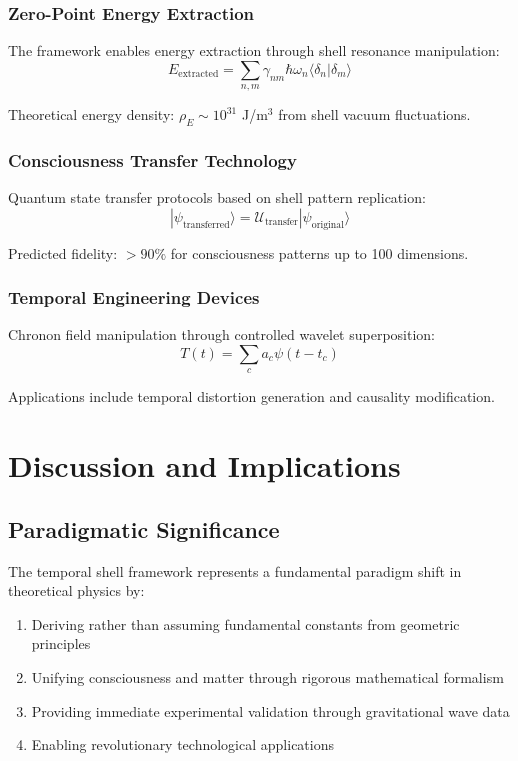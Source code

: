 \documentclass[12pt,a4paper]{article}
\begin{document}
\subsubsection{Zero-Point Energy Extraction}

The framework enables energy extraction through shell resonance manipulation:
\begin{equation}
E_{\text{extracted}} = \sum_{n,m} \gamma_{nm} \hbar\omega_n \langle\delta_n|\delta_m\rangle
\end{equation}

Theoretical energy density: $\rho_E \sim 10^{31}$ J/m$^3$ from shell vacuum fluctuations.

\subsubsection{Consciousness Transfer Technology}

Quantum state transfer protocols based on shell pattern replication:
\begin{equation}
|\psi_{\text{transferred}}\rangle = \mathcal{U}_{\text{transfer}} |\psi_{\text{original}}\rangle
\end{equation}

Predicted fidelity: $>90\%$ for consciousness patterns up to 100 dimensions.

\subsubsection{Temporal Engineering Devices}

Chronon field manipulation through controlled wavelet superposition:
\begin{equation}
T(t) = \sum_c a_c \psi(t - t_c)
\end{equation}

Applications include temporal distortion generation and causality modification.

\section{Discussion and Implications}

\subsection{Paradigmatic Significance}

The temporal shell framework represents a fundamental paradigm shift in theoretical physics by:
\begin{enumerate}
\item Deriving rather than assuming fundamental constants from geometric principles
\item Unifying consciousness and matter through rigorous mathematical formalism
\item Providing immediate experimental validation through gravitational wave data
\item Enabling revolutionary technological applications
\end{enumerate}
\end{document}
